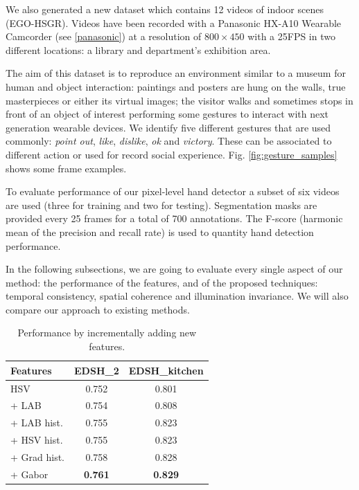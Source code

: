 We also generated a new dataset which contains 12 videos of indoor scenes (EGO-HSGR). Videos have been recorded with a Panasonic HX-A10 Wearable Camcorder (see \ref{panasonic}) at a resolution of $800 \times 450$ with a 25FPS in two different locations: a library and department's exhibition area.   

The aim of this dataset is to reproduce an environment similar to a museum for human and object interaction: paintings and posters are hung on the walls, true masterpieces or either its virtual images; the visitor walks and sometimes stops in front of an object of interest performing some gestures to interact with next generation wearable devices. We identify five different gestures that are used commonly: \textit{point out}, \textit{like}, \textit{dislike}, \textit{ok} and \textit{victory}. These can be associated to different action or used for record social experience. Fig. \ref{fig:gesture_samples} shows some frame examples. 

To evaluate performance of our pixel-level hand detector a subset of six videos are used (three for training and two for testing). Segmentation masks are provided every 25 frames for a total of 700 annotations. 
The F-score (harmonic mean of the precision and recall rate) is used to quantity hand detection performance.

In the following subsections, we are going to evaluate every single aspect of our method: the performance of the features, and of the proposed techniques: temporal consistency, spatial coherence and illumination invariance. We will also compare our approach to existing methods.
    
 \begin{table}
 \centering
 \begin{tabular}{|l|c|c|}
 \hline
 \textbf{Features} 	& \textbf{EDSH\_2} & \textbf{EDSH\_{kitchen}}	\\ \hline\hline
 HSV	& 0.752 & 0.801		\\ \hline
 + LAB	& 0.754	&	0.808 \\ \hline
 + LAB hist.	& 0.755 & 0.823			\\ \hline  
 + HSV hist. & 0.755 & 0.823			\\ \hline  
 + Grad hist. & 0.758	&	0.828	\\ \hline  
 + Gabor & 	\textbf{0.761}	& \textbf{0.829} \\ \hline  
 \end{tabular}
 \caption{Performance by incrementally adding new features.}\label{tab:localfeatures}
 \end{table}

